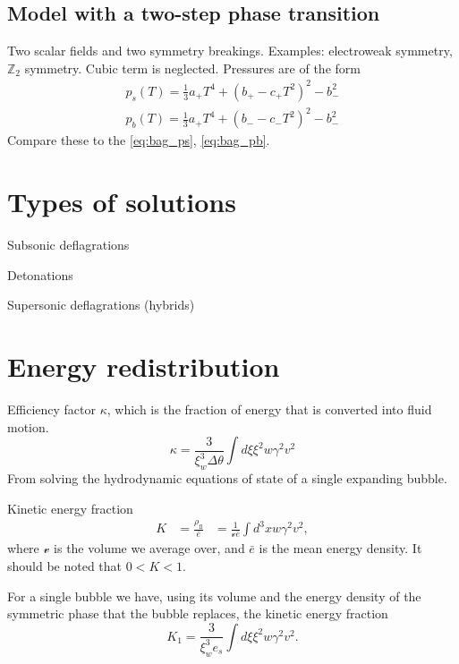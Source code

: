 \subsection{Model with a two-step phase transition}
Two scalar fields and two symmetry breakings. Examples: electroweak symmetry, $\mathbb{Z}_2$ symmetry.
Cubic term is neglected.
Pressures are of the form
\cite[eq. 47-48]{giese_2020}
\begin{align}
p_s(T) = \frac{1}{3}a_+ T^4 + (b_+ - c_+ T^2)^2 - b_-^2 \\
p_b(T) = \frac{1}{3}a_+ T^4 + (b_- - c_-T^2)^2 - b_-^2
\end{align}
Compare these to the \eqref{eq:bag_ps}, \eqref{eq:bag_pb}.



\section{Types of solutions}

Subsonic deflagrations

Detonations

Supersonic deflagrations (hybrids)


\section{Energy redistribution}
Efficiency factor $\kappa$, which is the fraction of energy that is converted into fluid motion.
\begin{equation}
\kappa = \frac{3}{\xi_w^3 \Delta \theta} \int d\xi \xi^2 w \gamma^2 v^2
\end{equation}
From solving the hydrodynamic equations of state of a single expanding bubble.

Kinetic energy fraction
\cites[eq. 7.36]{lecture_notes}[eq. 5]{giese_2020}
\begin{align}
K
&= \frac{\rho_\text{fl}}{\bar{e}}
&= \frac{1}{\mathcal{v} \bar{e}} \int d^3 x w \gamma^2 v^2,
\end{align}
where $\mathcal{v}$ is the volume we average over, and $\bar{e}$ is the mean energy density.
It should be noted that $0 < K < 1$.
\cite{giese_2020}

For a single bubble we have, using its volume and the energy density of the symmetric phase that the bubble replaces, the kinetic energy fraction
\cites[eq. 7.37]{lecture_notes}[eq. 5]{giese_2020}
\begin{equation}
K_1 = \frac{3}{\xi_w^3 e_s} \int d\xi \xi^2 w \gamma^2 v^2.
\end{equation}


